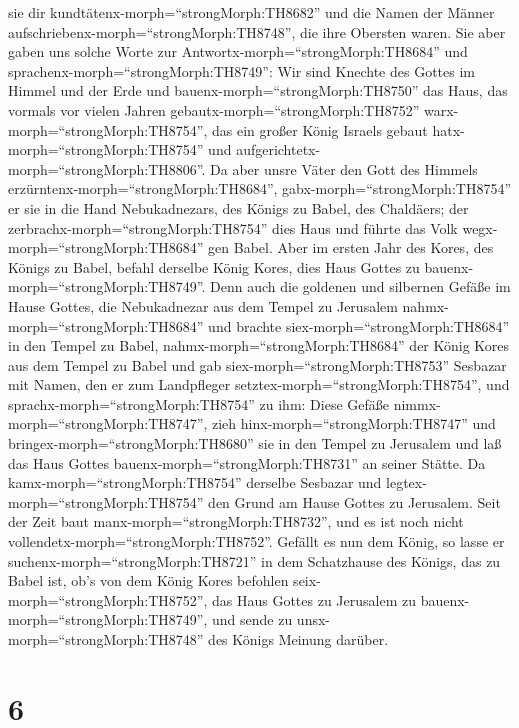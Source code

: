 sie dir kundtätenx-morph=``strongMorph:TH8682'' und die Namen der Männer
aufschriebenx-morph=``strongMorph:TH8748'', die ihre Obersten waren.
 Sie aber gaben uns solche Worte zur
Antwortx-morph=``strongMorph:TH8684'' und
sprachenx-morph=``strongMorph:TH8749'': Wir sind Knechte des Gottes im
Himmel und der Erde und bauenx-morph=``strongMorph:TH8750'' das Haus,
das vormals vor vielen Jahren gebautx-morph=``strongMorph:TH8752''
warx-morph=``strongMorph:TH8754'', das ein großer König Israels gebaut
hatx-morph=``strongMorph:TH8754'' und
aufgerichtetx-morph=``strongMorph:TH8806''.  Da aber unsre
Väter den Gott des Himmels erzürntenx-morph=``strongMorph:TH8684'',
gabx-morph=``strongMorph:TH8754'' er sie in die Hand Nebukadnezars, des
Königs zu Babel, des Chaldäers; der
zerbrachx-morph=``strongMorph:TH8754'' dies Haus und führte das Volk
wegx-morph=``strongMorph:TH8684'' gen Babel.  Aber im
ersten Jahr des Kores, des Königs zu Babel, befahl derselbe König Kores,
dies Haus Gottes zu bauenx-morph=``strongMorph:TH8749''. 
Denn auch die goldenen und silbernen Gefäße im Hause Gottes, die
Nebukadnezar aus dem Tempel zu Jerusalem
nahmx-morph=``strongMorph:TH8684'' und brachte
siex-morph=``strongMorph:TH8684'' in den Tempel zu Babel,
nahmx-morph=``strongMorph:TH8684'' der König Kores aus dem Tempel zu
Babel und gab siex-morph=``strongMorph:TH8753'' Sesbazar mit Namen, den
er zum Landpfleger setztex-morph=``strongMorph:TH8754'', 
und sprachx-morph=``strongMorph:TH8754'' zu ihm: Diese Gefäße
nimmx-morph=``strongMorph:TH8747'', zieh
hinx-morph=``strongMorph:TH8747'' und
bringex-morph=``strongMorph:TH8680'' sie in den Tempel zu Jerusalem und
laß das Haus Gottes bauenx-morph=``strongMorph:TH8731'' an seiner
Stätte.  Da kamx-morph=``strongMorph:TH8754'' derselbe
Sesbazar und legtex-morph=``strongMorph:TH8754'' den Grund am Hause
Gottes zu Jerusalem. Seit der Zeit baut
manx-morph=``strongMorph:TH8732'', und es ist noch nicht
vollendetx-morph=``strongMorph:TH8752''.  Gefällt es nun
dem König, so lasse er suchenx-morph=``strongMorph:TH8721'' in dem
Schatzhause des Königs, das zu Babel ist, ob's von dem König Kores
befohlen seix-morph=``strongMorph:TH8752'', das Haus Gottes zu Jerusalem
zu bauenx-morph=``strongMorph:TH8749'', und sende zu
unsx-morph=``strongMorph:TH8748'' des Königs Meinung darüber.

\hypertarget{section-5}{%
\section{6}\label{section-5}}

